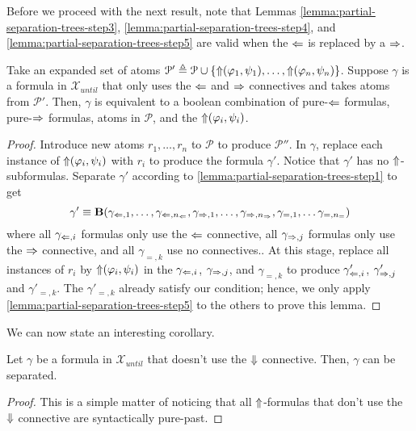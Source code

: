 \documentclass[a4paper,UKenglish,cleveref, autoref, thm-restate, numberwithinsect]{lipics-v2021}
\def\Larrow{\ensuremath\mathord{\Leftarrow}}
\def\Rarrow{\ensuremath\mathord{\Rightarrow}}
\def\Uarrow{\ensuremath\mathord{\Uparrow}}
\def\Darrow{\ensuremath\mathord{\Downarrow}}
\begin{document}
Before we proceed with the next result, note that Lemmas \ref{lemma:partial-separation-trees-step3}, \ref{lemma:partial-separation-trees-step4}, and \ref{lemma:partial-separation-trees-step5} are valid when the $\Larrow$ is replaced by a $\Rarrow$.
\begin{lemma}
    \label{lemma:partial-separation-trees-step6}
    Take an expanded set of atoms $\mathcal{P}' \triangleq \mathcal{P} \cup \{\Uarrow(\varphi_1, \psi_1), \ldots, \Uarrow(\varphi_n, \psi_n)\}$. Suppose $\gamma$ is a formula in $\mathcal{X}_{until}$ that only uses the $\Larrow$ and $\Rarrow$ connectives and takes atoms from $\mathcal{P}'$. Then, $\gamma$ is equivalent to a boolean combination of pure-$\Larrow$ formulas, pure-$\Rarrow$ formulas, atoms in $\mathcal{P}$, and the $\Uarrow(\varphi_i, \psi_i)$.
\end{lemma}
\begin{proof}
    Introduce new atoms $r_1, \ldots, r_n$ to $\mathcal{P}$ to produce $\mathcal{P}''$. In $\gamma$, replace each instance of $\Uarrow(\varphi_i, \psi_i)$ with $r_i$ to produce the formula $\gamma'$. Notice that $\gamma'$ has no $\Uarrow$-subformulas. Separate $\gamma'$ according to \cref{lemma:partial-separation-trees-step1} to get
    \begin{equation*}
        \gamma' \equiv \mathbf{B}(\gamma_{\Larrow, 1}, \ldots, \gamma_{\Larrow, n_{\Larrow}}, \gamma_{\Rarrow, 1}, \ldots, \gamma_{\Rarrow, n_{\Rarrow}}, \gamma_{=, 1}, \ldots \gamma_{=, n_=})
    \end{equation*}
    where all $\gamma_{\Larrow, i}$ formulas only use the $\Larrow$ connective, all $\gamma_{\Rarrow, j}$ formulas only use the $\Rarrow$ connective, and all $\gamma_{=, k}$ use no connectives.. At this stage, replace all instances of $r_i$ by $\Uarrow(\varphi_i, \psi_i)$ in the $\gamma_{\Larrow, i}$, $\gamma_{\Rarrow, j}$, and $\gamma_{=, k}$ to produce $\gamma'_{\Larrow, i}$, $\gamma'_{\Rarrow, j}$ and $\gamma'_{=, k}$. The $\gamma'_{=, k}$ already satisfy our condition; hence, we only apply \cref{lemma:partial-separation-trees-step5} to the others to prove this lemma.
\end{proof}
We can now state an interesting corollary.
\begin{corollary}
    \label{corollary:partial-separation-without-down}
    Let $\gamma$ be a formula in $\mathcal{X}_{until}$ that doesn't use the $\Darrow$ connective. Then, $\gamma$ can be separated.
\end{corollary}
\begin{proof}
    This is a simple matter of noticing that all $\Uarrow$-formulas that don't use the $\Darrow$ connective are syntactically pure-past.
\end{proof}
\end{document}
